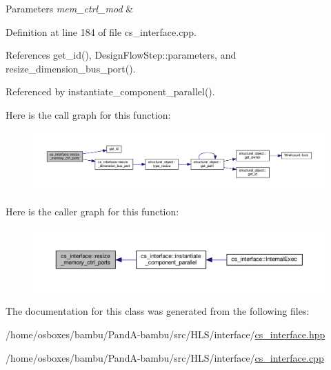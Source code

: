 \begin{DoxyParams}{Parameters}
{\em mem\+\_\+ctrl\+\_\+mod} & \\
\hline
\end{DoxyParams}


Definition at line 184 of file cs\+\_\+interface.\+cpp.



References get\+\_\+id(), Design\+Flow\+Step\+::parameters, and resize\+\_\+dimension\+\_\+bus\+\_\+port().



Referenced by instantiate\+\_\+component\+\_\+parallel().

Here is the call graph for this function\+:
\nopagebreak
\begin{figure}[H]
\begin{center}
\leavevmode
\includegraphics[width=350pt]{d1/dfa/classcs__interface_a616abde63bd8faaf2dd2d3ebed402ee8_cgraph}
\end{center}
\end{figure}
Here is the caller graph for this function\+:
\nopagebreak
\begin{figure}[H]
\begin{center}
\leavevmode
\includegraphics[width=350pt]{d1/dfa/classcs__interface_a616abde63bd8faaf2dd2d3ebed402ee8_icgraph}
\end{center}
\end{figure}


The documentation for this class was generated from the following files\+:\begin{DoxyCompactItemize}
\item 
/home/osboxes/bambu/\+Pand\+A-\/bambu/src/\+H\+L\+S/interface/\hyperlink{cs__interface_8hpp}{cs\+\_\+interface.\+hpp}\item 
/home/osboxes/bambu/\+Pand\+A-\/bambu/src/\+H\+L\+S/interface/\hyperlink{cs__interface_8cpp}{cs\+\_\+interface.\+cpp}\end{DoxyCompactItemize}
